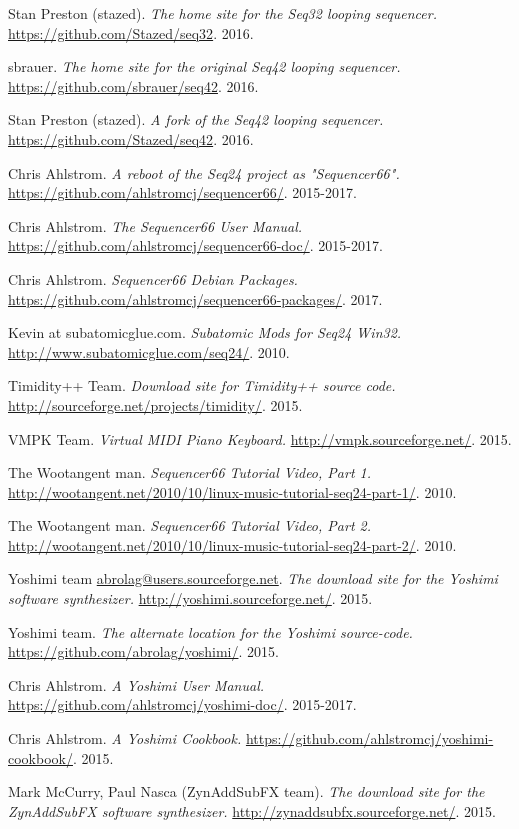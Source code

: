 \begin{thebibliography}{99}
   Stan Preston (stazed).
   \emph{The home site for the Seq32 looping sequencer.}
   \url{https://github.com/Stazed/seq32}.
   2016.

   sbrauer.
   \emph{The home site for the original Seq42 looping sequencer.}
   \url{https://github.com/sbrauer/seq42}.
   2016.

   Stan Preston (stazed).
   \emph{A fork of the Seq42 looping sequencer.}
   \url{https://github.com/Stazed/seq42}.
   2016.

   Chris Ahlstrom.
   \emph{A reboot of the Seq24 project as "Sequencer66".}
   \url{https://github.com/ahlstromcj/sequencer66/}.
   2015-2017.

   Chris Ahlstrom.
   \emph{The Sequencer66 User Manual.}
   \url{https://github.com/ahlstromcj/sequencer66-doc/}.
   2015-2017.

   Chris Ahlstrom.
   \emph{Sequencer66 Debian Packages.}
   \url{https://github.com/ahlstromcj/sequencer66-packages/}.
   2017.

   Kevin at subatomicglue.com.
   \emph{Subatomic Mods for Seq24 Win32.}
   \url{http://www.subatomicglue.com/seq24/}.
   2010.

   Timidity++ Team.
   \emph{Download site for Timidity++ source code.}
   \url{http://sourceforge.net/projects/timidity/}.
   2015.

   VMPK Team.
   \emph{Virtual MIDI Piano Keyboard.}
   \url{http://vmpk.sourceforge.net/}.
   2015.

   The Wootangent man.
   \emph{Sequencer66 Tutorial Video, Part 1.}
   \url{http://wootangent.net/2010/10/linux-music-tutorial-seq24-part-1/}.
   2010.

   The Wootangent man.
   \emph{Sequencer66 Tutorial Video, Part 2.}
   \url{http://wootangent.net/2010/10/linux-music-tutorial-seq24-part-2/}.
   2010.

   Yoshimi team \url{abrolag@users.sourceforge.net}.
   \emph{The download site for the Yoshimi software synthesizer.}
   \url{http://yoshimi.sourceforge.net/}.
   2015.

   Yoshimi team.
   \emph{The alternate location for the Yoshimi source-code.}
   \url{https://github.com/abrolag/yoshimi/}.
   2015.

   Chris Ahlstrom.
   \emph{A Yoshimi User Manual.}
   \url{https://github.com/ahlstromcj/yoshimi-doc/}.
   2015-2017.

   Chris Ahlstrom.
   \emph{A Yoshimi Cookbook.}
   \url{https://github.com/ahlstromcj/yoshimi-cookbook/}.
   2015.

   Mark McCurry, Paul Nasca (ZynAddSubFX team).
   \emph{The download site for the ZynAddSubFX software synthesizer.}
   \url{http://zynaddsubfx.sourceforge.net/}.
   2015.

\end{thebibliography}

